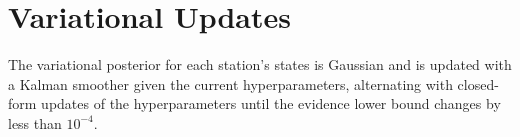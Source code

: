 \chapter{Variational Updates}
\label{app:a}

The variational posterior for each station's states is Gaussian and is updated with a Kalman
smoother given the current hyperparameters, alternating with closed-form updates of the
hyperparameters until the evidence lower bound changes by less than $10^{-4}$.
